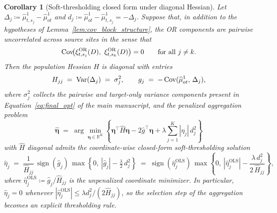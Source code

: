 \documentclass{article}
\newtheorem{corollary}[theorem]{Corollary}
\begin{document}
\begin{corollary}[Soft-thresholding closed form under diagonal Hessian]\label{cor:soft_threshold_face}
Let $\Delta_j\coloneqq \widehat{\mu}^1_{t,s_j}-\widehat{\mu}^1_{ot}$ and $d_j\coloneqq \widehat{\mu}^1_{ot}-\widehat{\mu}^1_{t,s_j}=-\Delta_j$. Suppose that, in addition to the hypotheses of Lemma~\ref{lem:cov_block_structure}, the OR components are pairwise uncorrelated across source sites in the sense that
\begin{equation}\label{eq:diag_cond}
\Cov\!\bigl(\xi^{\mathrm{OR}}_{t,s_j}(D),\ \xi^{\mathrm{OR}}_{t,s_k}(D)\bigr)=0\qquad\text{for all }j\neq k.
\end{equation}
Then the population Hessian $H$ is diagonal with entries
\[
H_{jj}\;=\;\operatorname{Var}(\Delta_j)\;=\;\sigma_j^2,\qquad g_j\;=\;-\operatorname{Cov}(\widehat{\mu}^1_{ot},\,\Delta_j),
\]
where $\sigma_j^2$ collects the pairwise and target-only variance components present in Equation~\eqref{eq:final_opt} of the main manuscript, and the penalized aggregation problem
\[
\widehat{\boldsymbol{\eta}}\;=\;\arg\min_{\boldsymbol{\eta}\in\mathbb{R}^K}\left\{\boldsymbol{\eta}^\top\widehat{H}\boldsymbol{\eta}-2\widehat{g}^\top\boldsymbol{\eta}+\lambda\sum_{j=1}^K|\eta_j|\,d_j^2\right\}
\]
with $\widehat{H}$ diagonal admits the coordinate-wise closed-form \emph{soft-thresholding} solution
\begin{equation}\label{eq:soft_thresh}
\widehat{\eta}_j
\;=\;
\frac{1}{\widehat{H}_{jj}}\,\operatorname{sign}(\widehat{g}_j)\,\max\!\left\{0,\ |\widehat{g}_j|-\tfrac{\lambda}{2}\,d_j^2\right\}
\;=\;
\operatorname{sign}(\widehat{\eta}_j^{\mathrm{OLS}})\,\max\!\left\{0,\ |\widehat{\eta}_j^{\mathrm{OLS}}|-\frac{\lambda\,d_j^2}{2\,\widehat{H}_{jj}}\right\},
\end{equation}
where $\widehat{\eta}_j^{\mathrm{OLS}}\coloneqq \widehat{g}_j/\widehat{H}_{jj}$ is the unpenalized coordinate minimizer. In particular, $\widehat{\eta}_j=0$ whenever $|\widehat{\eta}_j^{\mathrm{OLS}}|\le \lambda d_j^2/(2\widehat{H}_{jj})$, so the selection step of the aggregation becomes an explicit thresholding rule.
\end{corollary}
\end{document}
